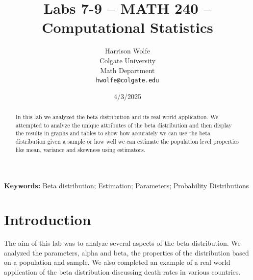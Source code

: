 \documentclass{article}\usepackage[]{graphicx}\usepackage[]{xcolor}
\begin{document}
\vspace{-1in}
\title{Labs 7-9 -- MATH 240 -- Computational Statistics}

\author{
  Harrison Wolfe \\
  Colgate University  \\
  Math Department  \\
  {\tt hwolfe@colgate.edu}
}

\date{4/3/2025}

\maketitle

\begin{multicols}{2}
\begin{abstract}
In this lab we analyzed the beta distribution and its real world application. We attempted to analyze the unique attributes of the beta distribution and then display the results in graphs and tables to show how accurately we can use the beta distribution given a sample or how well we can estimate the population level properties like mean, variance and skewness using estimators. 
\end{abstract}

\noindent \textbf{Keywords:} Beta distribution; Estimation; Parameters; Probability Distributions

\section{Introduction}
The aim of this lab was to analyze several aspects of the beta distribution. We analyzed the parameters, alpha and beta, the properties of the distribution based on a population and sample. We also completed an example of a real world application of the beta distribution discussing death rates in various countries. 


\end{multicols}
\end{document}
